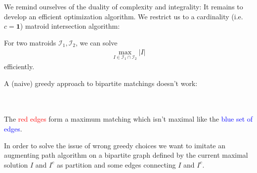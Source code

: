 We remind ourselves of the duality of complexity and integrality:
It remains to develop an efficient optimization algorithm.
We restrict us to a cardinality (i.e. $c = \mathbf{1}$) matroid intersection algorithm:
\begin{theorem}
    For two matroids $\mathcal I_1, \mathcal I_2$, we can solve
    \begin{align*}
        \max_{I \in \mathcal I_1 \cap \mathcal I_2}|I|
    \end{align*}
    efficiently.
\end{theorem}
\begin{observe}
    A (naive) greedy approach to bipartite matchings doesn't work:
    \\
    \\
    \begin{minipage}{\textwidth}
        \centering
    \end{minipage}
    \vspace{5pt}
    \\
    The \textcolor{red}{red edges} form a maximum matching which isn't maximal like the \textcolor{blue}{blue set of edges}.
\end{observe}
\begin{idea}
    In order to solve the issue of wrong greedy choices we want to imitate
    an augmenting path algorithm on a bipartite graph defined by the current maximal solution $I$ and $I^c$ as partition
    and some edges connecting $I$ and $I^c$.
\end{idea}
